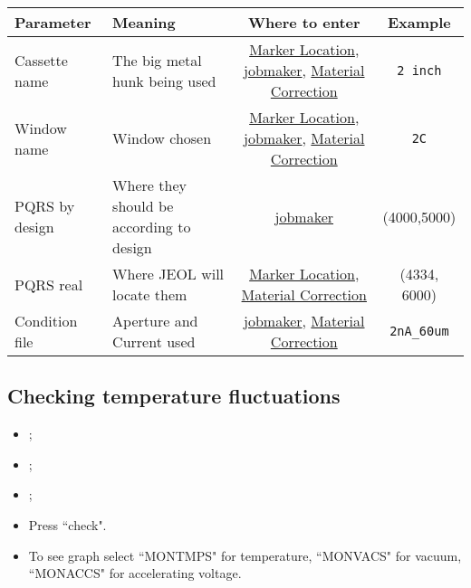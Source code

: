 \begin{table}[htbp]
  \centering
  \begin{tabular}{|p{3cm}|p{3cm}|c|c|}
    \hline
    \textbf{Parameter} & \textbf{Meaning} & \textbf{Where to enter} & \textbf{Example}\\\hline\hline
    Cassette name & The big metal hunk being used & \hyperref[sec:marker_location]{Marker Location}, \hyperref[sec:jobmaker]{jobmaker}, \hyperref[sec:material-correction]{Material Correction} & \texttt{2 inch}\\\hline

    Window name & Window chosen  & \hyperref[sec:marker_location]{Marker Location}, \hyperref[sec:jobmaker]{jobmaker}, \hyperref[sec:material-correction]{Material Correction} & \texttt{2C}\\\hline

    PQRS by design & Where they should be according to design & \hyperref[sec:jobmaker]{jobmaker} & (4000,5000) \\\hline
    PQRS real & Where JEOL will locate them & \hyperref[sec:marker_location]{Marker Location}, \hyperref[sec:material-correction]{Material Correction} & (4334, 6000)\\\hline
    Condition file & Aperture and Current used & \hyperref[sec:jobmaker]{jobmaker}, \hyperref[sec:material-correction]{Material Correction} & \verb|2nA_60um|\\\hline
  \end{tabular}
\end{table}


\subsection{Checking temperature fluctuations}
\label{Temperaturefluctuations}
\begin{itemize}
\item {};
\item {};
\item {};
\item Press ``check".
\item To  see graph  select ``MONTMPS" for  temperature, ``MONVACS"  for vacuum,
  ``MONACCS" for accelerating voltage.
\end{itemize}

